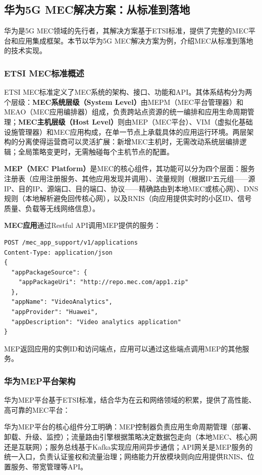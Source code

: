 \subsection{华为5G MEC解决方案：从标准到落地}

华为是5G MEC领域的先行者，其解决方案基于ETSI标准，提供了完整的MEC平台和应用集成框架。本节以华为5G MEC解决方案为例，介绍MEC从标准到落地的技术实现。

\subsubsection{ETSI MEC标准概述}

ETSI MEC标准定义了MEC系统的架构、接口、功能和API。其体系结构分为两个层级：\textbf{MEC系统层级（System Level）}由MEPM（MEC平台管理器）和MEAO（MEC应用编排器）组成，负责跨站点资源的统一编排和应用生命周期管理；\textbf{MEC主机层级（Host Level）}则由MEP（MEC平台）、VIM（虚拟化基础设施管理器）和MEC应用构成，在单一节点上承载具体的应用运行环境。两层架构的分离使得运营商可以灵活扩展：新增MEC主机时，无需改动系统层编排逻辑；全局策略变更时，无需触碰每个主机节点的配置。

\textbf{MEP（MEC Platform）}是MEC的核心组件，其功能可以分为四个层面：服务注册表（应用注册服务、其他应用发现并调用）、流量规则（根据IP五元组——源IP、目的IP、源端口、目的端口、协议——精确路由到本地MEC或核心网）、DNS规则（本地解析避免回传核心网），以及RNIS（向应用提供实时的小区ID、信号质量、负载等无线网络信息）。

\textbf{MEC应用}通过Restful API调用MEP提供的服务：

\begin{verbatim}
POST /mec_app_support/v1/applications
Content-Type: application/json
{
  "appPackageSource": {
    "appPackageUri": "http://repo.mec.com/app1.zip"
  },
  "appName": "VideoAnalytics",
  "appProvider": "Huawei",
  "appDescription": "Video analytics application"
}
\end{verbatim}

MEP返回应用的实例ID和访问端点，应用可以通过这些端点调用MEP的其他服务。

\subsubsection{华为MEP平台架构}

华为MEP平台基于ETSI标准，结合华为在云和网络领域的积累，提供了高性能、高可靠的MEC平台：

华为MEP平台的核心组件分工明确：MEP控制器负责应用生命周期管理（部署、卸载、升级、监控）；流量路由引擎根据策略决定数据包走向（本地MEC、核心网还是互联网）；服务总线基于Kafka实现应用间异步通信；API网关是MEP服务的统一入口，负责认证鉴权和流量治理；网络能力开放模块则向应用提供RNIS、位置服务、带宽管理等API。

